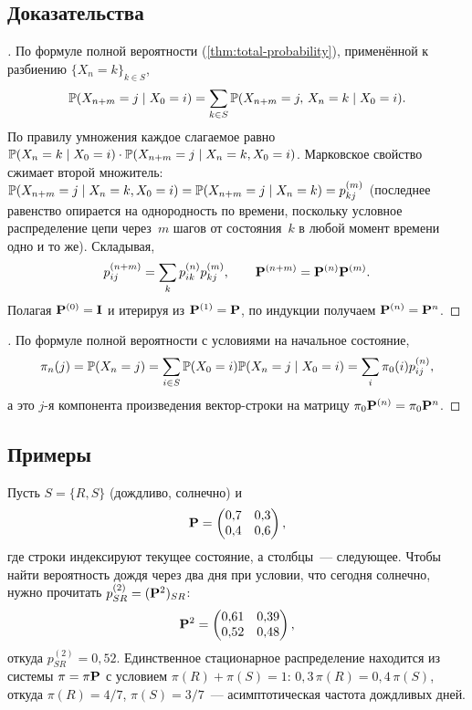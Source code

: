 \subsection*{Доказательства}

\begin{proof}[]
По формуле полной вероятности (\cref{thm:total-probability}), применённой к разбиению $\{X_n = k\}_{k \in S}$,
\[
  \mathbb{P}(X_{n+m} = j \mid X_0 = i) = \sum_{k \in S} \mathbb{P}(X_{n+m} = j,\, X_n = k \mid X_0 = i).
\]
По правилу умножения каждое слагаемое равно $\mathbb{P}(X_n = k \mid X_0 = i) \cdot \mathbb{P}(X_{n+m} = j \mid X_n = k, X_0 = i)$. Марковское свойство сжимает второй множитель: $\mathbb{P}(X_{n+m} = j \mid X_n = k, X_0 = i) = \mathbb{P}(X_{n+m} = j \mid X_n = k) = p_{kj}^{(m)}$ (последнее равенство опирается на однородность по времени, поскольку условное распределение цепи через~$m$ шагов от состояния~$k$ в любой момент времени одно и то же). Складывая,
\[
  p_{ij}^{(n+m)} = \sum_{k} p_{ik}^{(n)} p_{kj}^{(m)}, \qquad \mathbf{P}^{(n+m)} = \mathbf{P}^{(n)} \mathbf{P}^{(m)}.
\]
Полагая $\mathbf{P}^{(0)} = \mathbf{I}$ и итерируя из $\mathbf{P}^{(1)} = \mathbf{P}$, по индукции получаем $\mathbf{P}^{(n)} = \mathbf{P}^n$.
\end{proof}

\begin{proof}[]
По формуле полной вероятности с условиями на начальное состояние,
\[
  \pi_n(j) = \mathbb{P}(X_n = j) = \sum_{i \in S} \mathbb{P}(X_0 = i) \mathbb{P}(X_n = j \mid X_0 = i) = \sum_i \pi_0(i) p_{ij}^{(n)},
\]
а это $j$-я компонента произведения вектор-строки на матрицу $\pi_0 \mathbf{P}^{(n)} = \pi_0 \mathbf{P}^n$.
\end{proof}

\subsection*{Примеры}

\begin{example}
\label{ex:two-state-chain}
Пусть $S = \{R, S\}$ (дождливо, солнечно) и
\[
  \mathbf{P} = \begin{pmatrix} 0{,}7 & 0{,}3 \\ 0{,}4 & 0{,}6 \end{pmatrix},
\]
где строки индексируют текущее состояние, а столбцы~--- следующее. Чтобы найти вероятность дождя через два дня при условии, что сегодня солнечно, нужно прочитать $p_{SR}^{(2)} = (\mathbf{P}^2)_{SR}$:
\[
  \mathbf{P}^2 = \begin{pmatrix} 0{,}61 & 0{,}39 \\ 0{,}52 & 0{,}48 \end{pmatrix},
\]
откуда $p_{SR}^{(2)} = 0{,}52$. Единственное стационарное распределение находится из системы $\pi = \pi \mathbf{P}$ с условием $\pi(R) + \pi(S) = 1$: $0{,}3\, \pi(R) = 0{,}4\, \pi(S)$, откуда $\pi(R) = 4/7$, $\pi(S) = 3/7$~--- асимптотическая частота дождливых дней.
\end{example}

